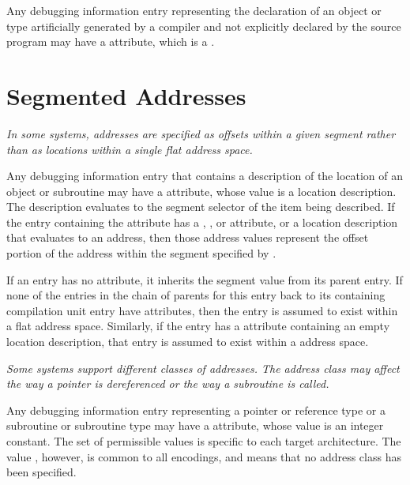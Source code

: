 Any debugging information entry representing the
declaration of an object or type artificially generated by
a compiler and not explicitly declared by the source 
program\hypertarget{chap:DWATartificialobjectsortypesthat}{}
may have a 
\DWATartificialDEFN{} attribute, 
which is a .

\section{Segmented Addresses}
\label{chap:segmentedaddresses}
\textit{In some systems, addresses are specified as offsets within a
given 
segment 
rather than as locations within a single flat
address space.}

Any debugging information entry that contains a description
of\hypertarget{chap:DWATsegmentaddressinginformation}{}
the location of an object or subroutine may have a 
\DWATsegmentDEFN{} attribute, 
whose value is a location
description. The description evaluates to the segment selector
of the item being described. If the entry containing the
\DWATsegmentNAME{} attribute has a 
\DWATlowpc, 
\DWAThighpc,
\DWATranges{} or 
\DWATentrypc{} attribute, 
or 
a location
description that evaluates to an address, then those address
values represent the offset portion of the address within
the segment specified 
by \DWATsegmentNAME.

If an entry has no 
\DWATsegmentNAME{} attribute, it inherits
the segment value from its parent entry.  If none of the
entries in the chain of parents for this entry back to
its containing compilation unit entry have 
\DWATsegmentNAME{} attributes, 
then the entry is assumed to exist within a flat
address space. 
Similarly, if the entry has a 
\DWATsegmentNAME{} attribute 
containing an empty location description, that
entry is assumed to exist within a 
address space.

\textit{Some systems support different 
classes of addresses. 
The address class may affect the way a pointer is dereferenced
or the way a subroutine is called.}


Any debugging information entry representing a pointer or
reference type or a subroutine or subroutine type may 
have a 
\DWATaddressclass{}
attribute, whose value is an integer
constant.  The set of permissible values is specific to
each target architecture. The value \DWADDRnoneTARG, 
however,
is common to all encodings, and means that no address class
has been specified.

